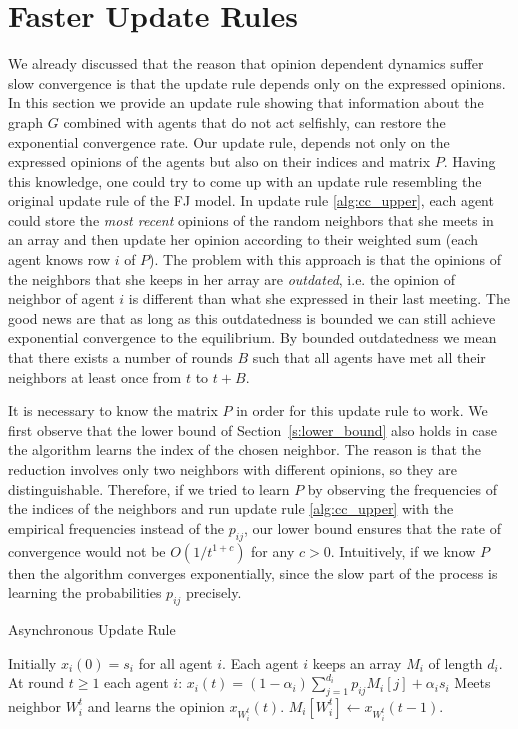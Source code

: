 \section{Faster Update Rules}\label{s:cc_convergence}

We already discussed that the reason that opinion dependent dynamics suffer slow
convergence is that the update rule depends only on the expressed opinions.
In this section we provide an update rule showing that information about the
graph $G$ combined with agents that do not act selfishly, can restore the
exponential convergence rate.
Our update rule, depends not only on the expressed opinions of the
agents but also on their indices and matrix $P$.
Having this knowledge, one could try to come up with an
update rule resembling the original update rule of the FJ model.
In update rule \ref{alg:cc_upper}, each agent could store the
\emph{most recent} opinions of the random neighbors that she meets in an array
and then update her
opinion according to their weighted sum (each agent knows row $i$ of $P$).
The problem with this approach is that the opinions of the neighbors
that she keeps in her array are \emph{outdated}, i.e. the opinion of
neighbor of agent $i$ is different than what she expressed in their
last meeting.  The good news are that as long as this outdatedness
is bounded we can still achieve exponential convergence to the
equilibrium.  By bounded outdatedness we mean that there exists a
number of rounds $B$ such that all agents have met all their neighbors
at least once from $t$ to $t+B$.
\begin{remark}
It is necessary to know the matrix $P$ in order for this
update rule to work. We first observe that the lower bound of
Section~\ref{s:lower_bound} also holds in case the algorithm learns the index
of the chosen neighbor. The reason is that the reduction involves only two neighbors
with different opinions, so they are distinguishable.
Therefore, if we tried to learn $P$ by observing the frequencies
of the indices of the neighbors and run update rule \ref{alg:cc_upper}
with the empirical frequencies instead of the $p_{ij}$, our lower bound
ensures that the rate of convergence would not be $O(1/t^{1+c})$ for any $c>0$.
Intuitively, if we know $P$ then the algorithm converges exponentially,
since the slow part of the process is learning the probabilities $p_{ij}$
precisely.
\end{remark}
\begin{algorithm}
  \caption{Asynchronous Update Rule}
  \label{alg:cc_upper}
  \begin{algorithmic}[1]
    \STATE Initially $x_i(0) = s_i$ for all agent $i$.
    \STATE Each agent $i$ keeps an array $M_i$ of length $d_i$.
    \STATE At round $t\geq 1$ each agent $i$:
    \bindent
    \STATE $x_i(t) = (1-\alpha_i)\sum_{j=1}^{d_i} p_{ij} M_i[j] + \alpha_is_i$
    \STATE Meets neighbor $W_i^t$ and learns the opinion $x_{W_i^t}(t)$.
    \STATE $M_i[W_i^t] \gets x_{W_i^t}(t-1)$.
    \eindent
  \end{algorithmic}
\end{algorithm}

